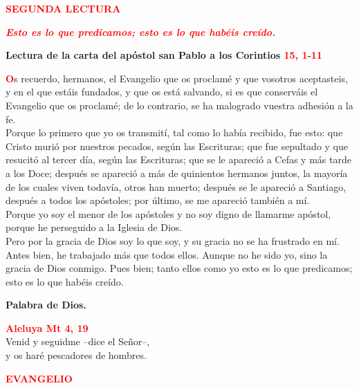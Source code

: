 \documentclass[12pt, letterpaper]{report}
\begin{document}
\newpage

\begin{center}
\Large {\bfseries \textcolor{red}{SEGUNDA LECTURA}}
\end{center}

\begin{center}
\large {\bfseries \textit{ \textcolor{red}{Esto es lo que predicamos; esto es lo que hab\'eis cre\'ido.}}}
\end{center}

\Large {\bfseries Lectura de la carta del ap\'ostol san Pablo a los Corintios \hspace{1cm} \textcolor{red}{15, 1-11}}

\lettrine[lines=2]{\bfseries \textcolor{red}{O}}{}\Large s recuerdo, hermanos, el Evangelio que os proclam\'e y que vosotros aceptasteis, y en el que est\'ais fundados, y que os est\'a salvando, si es que conserv\'ais el Evangelio que os proclam\'e; de lo contrario, se ha malogrado vuestra adhesi\'on a la fe.\\
Porque lo primero que yo os transmit\'i, tal como lo hab\'ia recibido, fue esto: que Cristo muri\'o por nuestros pecados, seg\'un las Escrituras; que fue sepultado y que resucit\'o al tercer d\'ia, seg\'un las Escrituras; que se le apareci\'o a Cefas y m\'as tarde a los Doce; despu\'es se apareci\'o a m\'as de quinientos hermanos juntos, la mayor\'ia de los cuales viven todav\'ia, otros han muerto; despu\'es se le apareci\'o a Santiago, despu\'es a todos los ap\'ostoles; por \'ultimo, se me apareci\'o tambi\'en a m\'i.\\
Porque yo soy el menor de los ap\'ostoles y no soy digno de llamarme ap\'ostol, porque he perseguido a la Iglesia de Dios.\\
Pero por la gracia de Dios soy lo que soy, y su gracia no se ha frustrado en m\'i. Antes bien, he trabajado m\'as que todos ellos. Aunque no he sido yo, sino la gracia de Dios conmigo. Pues bien; tanto ellos como yo esto es lo que predicamos; esto es lo que hab\'eis cre\'ido.

{\bfseries Palabra de Dios.}

\begin{center}
\Large {\bfseries \textcolor{red}{Aleluya \hspace{1cm} Mt 4, 19}}\\
Venid y seguidme --dice el Se\~nor--,\\
y os har\'e pescadores de hombres.
\end{center}

\begin{center}
\Large {\bfseries \textcolor{red}{EVANGELIO}}
\end{center}
\end{document}
